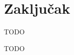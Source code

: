 \documentclass[times, utf8, diplomski, numeric]{templates/template}
\begin{document}
\chapter{Zaključak}{
    TODO
}




\begin{sazetak}{
    TODO
}

\end{sazetak}

\begin{abstract}{
    TODO
}

\end{abstract}
\end{document}
